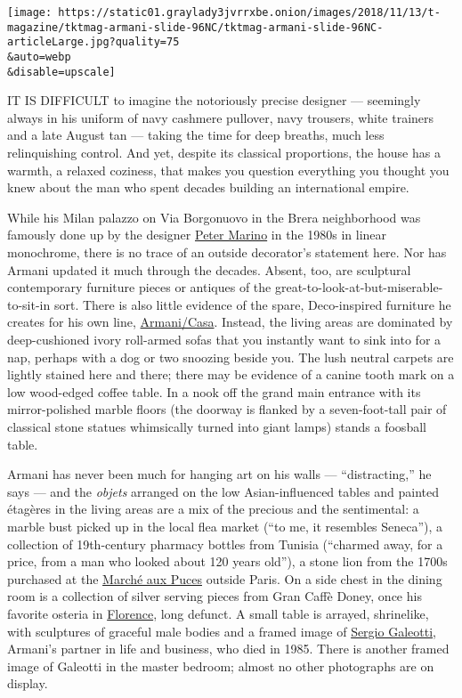 \texttt{[image: https://static01.graylady3jvrrxbe.onion/images/2018/11/13/t-magazine/tktmag-armani-slide-96NC/tktmag-armani-slide-96NC-articleLarge.jpg?quality=75\\\&auto=webp\\\&disable=upscale]}

IT IS DIFFICULT to imagine the notoriously precise designer ---
seemingly always in his uniform of navy cashmere pullover, navy
trousers, white trainers and a late August tan --- taking the time for
deep breaths, much less relinquishing control. And yet, despite its
classical proportions, the house has a warmth, a relaxed coziness, that
makes you question everything you thought you knew about the man who
spent decades building an international empire.

While his Milan palazzo on Via Borgonuovo in the Brera neighborhood was
famously done up by the designer
\href{https://www.nytimes3xbfgragh.onion/2012/03/11/magazine/peter-marino-likes-playing-bad-cop.html}{Peter
Marino} in the 1980s in linear monochrome, there is no trace of an
outside decorator's statement here. Nor has Armani updated it much
through the decades. Absent, too, are sculptural contemporary furniture
pieces or antiques of the great-to-look-at-but-miserable-to-sit-in sort.
There is also little evidence of the spare, Deco-inspired furniture he
creates for his own line,
\href{https://www.armani.com/casa/us/}{Armani/Casa}. Instead, the living
areas are dominated by deep-cushioned ivory roll-armed sofas that you
instantly want to sink into for a nap, perhaps with a dog or two
snoozing beside you. The lush neutral carpets are lightly stained here
and there; there may be evidence of a canine tooth mark on a low
wood-edged coffee table. In a nook off the grand main entrance with its
mirror-polished marble floors (the doorway is flanked by a
seven-foot-tall pair of classical stone statues whimsically turned into
giant lamps) stands a foosball table.

Armani has never been much for hanging art on his walls ---
``distracting,'' he says --- and the \emph{objets} arranged on the low
Asian-influenced tables and painted étagères in the living areas are a
mix of the precious and the sentimental: a marble bust picked up in the
local flea market (``to me, it resembles Seneca''), a collection of
19th-century pharmacy bottles from Tunisia (``charmed away, for a price,
from a man who looked about 120 years old''), a stone lion from the
1700s purchased at the
\href{https://www.nytimes3xbfgragh.onion/2014/11/30/travel/at-a-paris-flea-market-tips-for-treasure-hunters.html}{Marché
aux Puces} outside Paris. On a side chest in the dining room is a
collection of silver serving pieces from Gran Caffè Doney, once his
favorite osteria in
\href{https://www.nytimes3xbfgragh.onion/2014/09/28/travel/things-to-do-in-36-hours-in-florence-italy.html}{Florence},
long defunct. A small table is arrayed, shrinelike, with sculptures of
graceful male bodies and a framed image of
\href{https://www.nytimes3xbfgragh.onion/1985/08/16/nyregion/sergio-galeotti.html}{Sergio
Galeotti}, Armani's partner in life and business, who died in 1985.
There is another framed image of Galeotti in the master bedroom; almost
no other photographs are on display.

